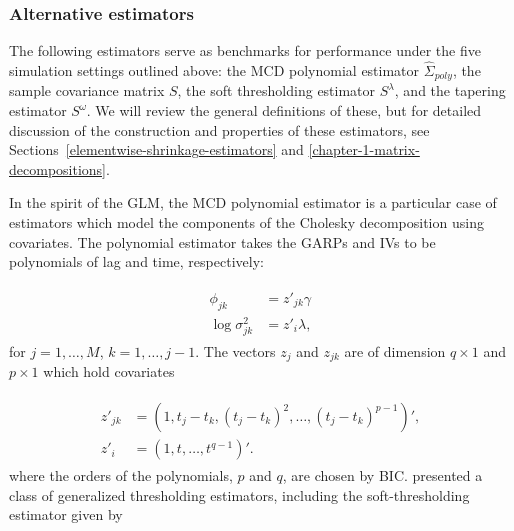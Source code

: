 \subsubsection{Alternative estimators}
%
The following estimators serve as benchmarks for performance under the five simulation settings outlined above: the MCD polynomial estimator $\hat{\Sigma}_{poly}$, the sample covariance matrix $S$, the soft thresholding estimator $S^\lambda$, and the tapering estimator $S^\omega$. We will review the general definitions of these, but for detailed discussion of the construction and properties of these estimators, see Sections~\ref{elementwise-shrinkage-estimators} and \ref{chapter-1-matrix-decompositions}.

\bigskip

In the spirit of the GLM, the MCD polynomial estimator is a particular case of estimators which model the components of the Cholesky decomposition using covariates. The polynomial estimator takes the GARPs and IVs to be polynomials of lag and time, respectively:

\begin{align*}
\begin{split}  \label{eq:GARP-IV-parametric-model}
\phi_{jk} &= z'_{jk} \gamma \\
\log \sigma^2_{jk} &= z'_{i}\lambda, 
\end{split}
\end{align*}
\noindent
for $j = 1,\dots, M$, $k = 1,\dots, j-1$. The vectors $z_j$ and $z_{jk}$ are of dimension $q \times 1$ and $p \times 1$  which hold covariates

\begin{align}
\begin{split} 
z'_{jk} &= \left(1, t_j - t_k, \left(t_j - t_k\right)^2,\dots, \left(t_j - t_k\right)^{p-1}\right)', \\
z'_{i}  &= \left(1, t, \dots, t^{q-1}\right)'.
\end{split}
\end{align} \label{eq:mcd-polynomial-model}
\noindent
where the orders of the polynomials, $p$ and $q$, are chosen by BIC. \cite{rothman2009generalized} presented a class of generalized thresholding estimators, including the soft-thresholding estimator given by

